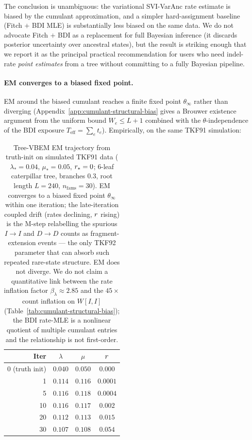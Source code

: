 The conclusion is unambiguous: the variational SVI-VarAnc rate
estimate is biased by the cumulant approximation, and a simpler
hard-assignment baseline (Fitch $+$ BDI MLE) is substantially
less biased on the same data.  We do not advocate Fitch $+$ BDI
as a replacement for full Bayesian inference (it discards
posterior uncertainty over ancestral states), but the result is
striking enough that we report it as the principal practical
recommendation for users who need indel-rate \emph{point
estimates} from a tree without committing to a fully Bayesian
pipeline.

\paragraph{EM converges to a biased fixed point.}
EM around the biased cumulant reaches a finite fixed point
$\theta_\infty$ rather than diverging
(Appendix~\ref{app:cumulant-structural-bias} gives a Brouwer
existence argument from the uniform bound $W_e \leq L+1$
combined with the $\theta$-independence of the BDI exposure
$T_{\text{eff}} = \sum_e t_e$).  Empirically, on the same TKF91
simulation:

\begin{table}[ht]
\centering\small
\begin{tabular}{rccc}
\toprule
Iter & $\lambda$ & $\mu$ & $r$ \\
\midrule
0 (truth init) & $0.040$ & $0.050$ & $0.000$ \\
1               & $0.114$ & $0.116$ & $0.0001$ \\
5               & $0.116$ & $0.118$ & $0.0004$ \\
10              & $0.116$ & $0.117$ & $0.002$ \\
20              & $0.112$ & $0.113$ & $0.015$ \\
30              & $0.107$ & $0.108$ & $0.054$ \\
\bottomrule
\end{tabular}
\caption{Tree-VBEM EM trajectory from truth-init on simulated
TKF91 data ($\lambda_* = 0.04$, $\mu_* = 0.05$, $r_* = 0$;
6-leaf caterpillar tree, branches $0.3$, root length $L = 240$,
$n_{\text{fams}} = 30$).  EM converges to a biased fixed point
$\theta_\infty$ within one iteration; the late-iteration coupled
drift (rates declining, $r$ rising) is the M-step relabelling
the spurious $I\!\to\!I$ and $D\!\to\!D$ counts as
fragment-extension events --- the only TKF92 parameter that can
absorb such repeated rare-state structure.  EM does not diverge.
We do not claim a quantitative link between the rate inflation
factor $\beta_\lambda \approx 2.85$ and the $45\times$ count
inflation on $W[I, I]$
(Table~\ref{tab:cumulant-structural-bias}); the BDI rate-MLE is a
nonlinear quotient of multiple cumulant entries and the
relationship is not first-order.}
\label{tab:em-convergence-from-truth-inline}
\end{table}


